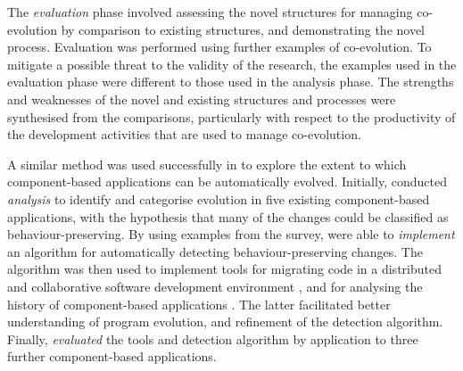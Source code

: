 The \emph{evaluation} phase involved assessing the novel structures for managing co-evolution by comparison to existing structures, and demonstrating the novel process. Evaluation was performed using further examples of co-evolution. To mitigate a possible threat to the validity of the research, the examples used in the evaluation phase were different to those used in the analysis phase. The strengths and weaknesses of the novel and existing structures and processes were synthesised from the comparisons, particularly with respect to the productivity of the development activities that are used to manage co-evolution.

A similar method was used successfully in \cite{dig07thesis} to explore the extent to which component-based applications can be automatically evolved. Initially, \cite{dig06apis} conducted \emph{analysis} to identify and categorise evolution in five existing component-based applications, with the hypothesis that many of the changes could be classified as behaviour-preserving. By using examples from the survey, \cite{dig06detection} were able to \emph{implement} an algorithm for automatically detecting behaviour-preserving changes. The algorithm was then used to implement tools for migrating code in a distributed and collaborative software development environment \cite{dig06automatic}, and for analysing the history of component-based applications \cite{dig07cms}. The latter facilitated better understanding of program evolution, and refinement of the detection algorithm. Finally, \cite{dig07thesis} \emph{evaluated} the tools and detection algorithm by application to three further component-based applications.